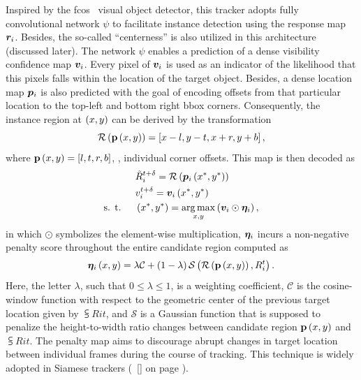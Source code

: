 Inspired by the \gls{fcos}~\cite{tian2019fcos} visual object detector, this tracker adopts fully convolutional network $\psi$ to facilitate instance detection using the response map $\bm{r}_{i}$. Besides, the so-called ``centerness'' is also utilized in this architecture (discussed later). The network $\psi$ enables a prediction of a dense visibility confidence map $\bm{v}_{i}$. Every pixel of $\bm{v}_{i}$ is used as an indicator of the likelihood that this pixels falls within the location of the target object. Besides, a dense location map $\bm{p}_{i}$ is also predicted with the goal of encoding offsets from that particular location to the top-left and bottom right \gls{bbox} corners. Consequently, the instance region at $\left( {x, y} \right)$ can be derived by the transformation
\begin{equation}
    {\mathcal{R}} \left( {\mathbf{p}} \left( x, y \right) \right) =
    \left[ {x - l, y - t, x + r, y + b} \right],
\end{equation}
where ${\mathbf{p}} \left( x, y \right) = \left[ {l, t, r, b} \right]$, \ietext{}, individual corner offsets. This map is then decoded as
\begin{equation}
    \begin{aligned}
                            & {\tilde{R}}_{i}^{t + \delta} =
        {\mathcal{R}} \left( {\bm{p}_{i}} \left( x^*, y^* \right) \right)                                                                      \\
                            & {v}_{i}^{t + \delta} = {\bm{v}_{i}} \left( x^*, y^* \right)                                        \\
        \text{s. t. } \quad & \left( {x^*, y^*} \right) = \underset{x, y}{\operatorname*{arg\,max}} \left( {\bm{v}_{i} \odot \bm{\eta}_{i}} \right),
    \end{aligned}
\end{equation}
in which $\odot$ symbolizes the element-wise multiplication, $\bm{\eta}_{i}$ incurs a non-negative penalty score throughout the entire candidate region computed as
\begin{equation}
    {\bm{\eta}_{i}} \left( x, y \right) =
    \lambda \mathcal{C} +
    \left( {1 - \lambda} \right) {\mathcal{S}} \left( 
        {\mathcal{R}} \left( 
            {\mathbf{p}} \left( x, y \right)
         \right),
        {R}_{i}^{t}
     \right).
\end{equation}
Here, the letter $\lambda$, such that $0 \leq \lambda \leq 1$, is a weighting coefficient, $\mathcal{C}$ is the cosine-window function with respect to the geometric center of the previous target location given by $\subsup{R}{i}{t}$, and $\mathcal{S}$ is a Gaussian function that is supposed to penalize the height-to-width ratio changes between candidate region ${\mathbf{p}} \left( x, y \right)$ and $\subsup{R}{i}{t}$. The penalty map aims to discourage abrupt changes in target location between individual frames during the course of tracking. This technique is widely adopted in Siamese trackers (\sectiontext{}~\ref{} on page \pageref{}).  %

